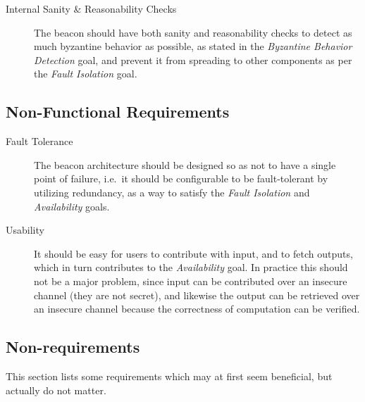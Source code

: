 \begin{description}


\item [Internal Sanity \& Reasonability Checks]
The beacon should have both sanity and reasonability checks to detect as much byzantine behavior as possible, as stated in the \emph{Byzantine Behavior Detection} goal, and prevent it from spreading to other components as per the \emph{Fault Isolation} goal.

\end{description}

\subsection{Non-Functional Requirements}%
\label{sub:non_functional_requirements}

\begin{description}
    \item[Fault Tolerance]
The beacon architecture should be designed so as not to have a single point of failure, i.e.\ it should be configurable to be fault-tolerant by utilizing redundancy, as a way to satisfy the \emph{Fault Isolation} and \emph{Availability} goals.


    \item[Usability]
It should be easy for users to contribute with input, and to fetch outputs, which in turn contributes to the \emph{Availability} goal.
In practice this should not be a major problem, since input can be contributed over an insecure channel (they are not secret), and likewise the output can be retrieved over an insecure channel because the correctness of computation can be verified.
\end{description}

\subsection{Non-requirements}
This section lists some requirements which may at first seem beneficial, but actually do not matter.

